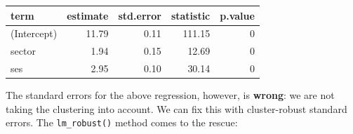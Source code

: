 \documentclass[
  letterpaper,
  DIV=11,
  numbers=noendperiod]{scrreprt}
\newenvironment{Shaded}{}{}
\newcommand{\AttributeTok}[1]{\textcolor[rgb]{0.49,0.56,0.16}{#1}}
\newcommand{\DecValTok}[1]{\textcolor[rgb]{0.25,0.63,0.44}{#1}}
\newcommand{\FunctionTok}[1]{\textcolor[rgb]{0.02,0.16,0.49}{#1}}
\newcommand{\NormalTok}[1]{#1}
\newcommand{\OtherTok}[1]{\textcolor[rgb]{0.00,0.44,0.13}{#1}}
\newcommand{\SpecialCharTok}[1]{\textcolor[rgb]{0.25,0.44,0.63}{#1}}
\begin{document}
\begin{longtable}[]{@{}lrrrr@{}}
\toprule\noalign{}
term & estimate & std.error & statistic & p.value \\
\midrule\noalign{}
\endhead
\bottomrule\noalign{}
\endlastfoot
(Intercept) & 11.79 & 0.11 & 111.15 & 0 \\
sector & 1.94 & 0.15 & 12.69 & 0 \\
ses & 2.95 & 0.10 & 30.14 & 0 \\
\end{longtable}

The standard errors for the above regression, however, is
\textbf{wrong}: we are not taking the clustering into account. We can
fix this with cluster-robust standard errors. The \texttt{lm\_robust()}
method comes to the rescue:

\begin{Shaded}
\end{Shaded}
\end{document}
